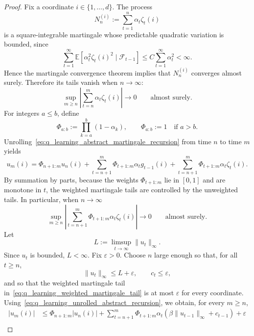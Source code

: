 \documentclass{article}
\numberwithin{equation}{section}
\newcommand{\E}{\mathbb E}
\newcommand{\norm}[1]{\|#1\|}
\newcommand{\cF}{\mathcal{F}}
\renewcommand{\epsilon}{\varepsilon}
\begin{document}
\begin{proof}
Fix a coordinate \(i\in\{1,\ldots,d\}\). The process
\[
    N_n^{(i)}:=\sum_{t=1}^{n}\alpha_t\zeta_t(i)
\]
is a square-integrable martingale whose predictable quadratic variation is bounded, since
\[
    \sum_{t=1}^{\infty}
    \E[\alpha_t^2\zeta_t(i)^2\mid\cF_{t-1}]
    \le
    C\sum_{t=1}^{\infty}\alpha_t^2
    <
    \infty.
\]
Hence the martingale convergence theorem implies that \(N_n^{(i)}\) converges almost surely. Therefore its tails vanish when \(n\rightarrow\infty\):
\begin{equation}
\label{eq:q_learning_unweighted_martingale_tail}
    \sup_{m\ge n}
    \left|
    \sum_{t=n}^{m}\alpha_t\zeta_t(i)
    \right|
    \longrightarrow0
    \qquad
    \text{almost surely.}
\end{equation}
For integers \(a\le b\), define
\[
    \Phi_{a:b}:=\prod_{k=a}^{b}(1-\alpha_k),
    \qquad
    \Phi_{a:b}:=1\quad\text{if }a>b.
\]
Unrolling~\eqref{eq:q_learning_abstract_martingale_recursion} from time \(n\) to time \(m\) yields
\begin{equation}
\label{eq:q_learning_unrolled_abstract_recursion}
    u_m(i)
    =
    \Phi_{n+1:m}u_n(i)
    +
    \sum_{t=n+1}^{m}\Phi_{t+1:m}\alpha_t g_{t-1}(i)
    +
    \sum_{t=n+1}^{m}\Phi_{t+1:m}\alpha_t\zeta_t(i).
\end{equation}
By summation by parts, because the weights \(\Phi_{t+1:m}\) lie in \([0,1]\) and are monotone in \(t\), the weighted martingale tails are controlled by the unweighted tails. In particular, when \(n\rightarrow\infty\)
\begin{equation}
\label{eq:q_learning_weighted_martingale_tail}
    \sup_{m\ge n}
    \left|
    \sum_{t=n+1}^{m}\Phi_{t+1:m}\alpha_t\zeta_t(i)
    \right|
    \longrightarrow0
    \qquad
    \text{almost surely.}
\end{equation}
Let
\[
    L:=\limsup_{t\to\infty}\norm{u_t}_\infty.
\]
Since \(u_t\) is bounded, \(L<\infty\). Fix \(\epsilon>0\). Choose \(n\) large enough so that, for all \(t\ge n\),
\[
    \norm{u_t}_\infty\le L+\epsilon,
    \qquad
    c_t\le\epsilon,
\]
and so that the weighted martingale tail in~\eqref{eq:q_learning_weighted_martingale_tail} is at most \(\epsilon\) for every coordinate. Using~\eqref{eq:q_learning_unrolled_abstract_recursion}, we obtain, for every \(m\ge n\),
\begin{align*}
    |u_m(i)|
    &\le
    \Phi_{n+1:m}|u_n(i)|
    +
    \sum_{t=n+1}^{m}\Phi_{t+1:m}\alpha_t
    \left(\beta\norm{u_{t-1}}_\infty+c_{t-1}\right)
    +
    \epsilon
    \\

\end{align*}
\end{proof}
\end{document}
